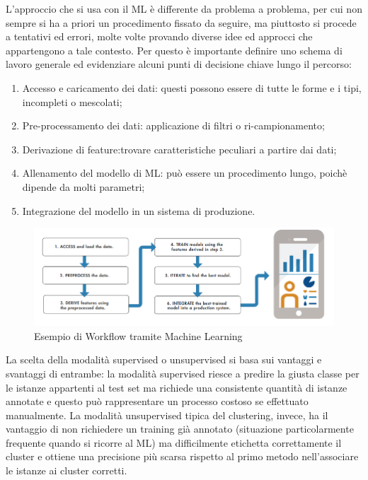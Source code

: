L'approccio che si usa con il ML è differente da problema a problema, per cui non sempre si ha a priori un procedimento fissato da seguire, ma piuttosto si procede a tentativi ed errori, molte volte provando diverse idee ed approcci che appartengono a tale contesto. Per questo è importante definire uno schema di lavoro generale ed evidenziare alcuni punti di decisione chiave lungo il percorso:
\begin{enumerate}
	\item Accesso e caricamento dei dati: questi possono essere di tutte le forme e i tipi, incompleti o mescolati;
	\item Pre-processamento dei dati: applicazione di filtri o ri-campionamento;
	\item Derivazione di feature:trovare caratteristiche peculiari a partire dai dati;
	\item Allenamento del modello di ML: può essere un procedimento lungo, poichè dipende da molti parametri;
	\item Integrazione del modello in un sistema di produzione.
\end{enumerate}
\begin{figure}[]
	\centering
	\includegraphics[scale=0.55]{images/Workflow_ML.png}
	\caption{Esempio di Workflow tramite Machine Learning}
\end{figure}
La scelta della modalità supervised o unsupervised si basa sui vantaggi e svantaggi di entrambe: la modalità supervised riesce a predire la giusta classe per le istanze appartenti al test set ma richiede una consistente quantità di istanze annotate e questo può rappresentare un processo costoso se effettuato manualmente. La modalità unsupervised tipica del clustering, invece, ha il vantaggio di non richiedere un training già annotato (situazione particolarmente frequente quando si
ricorre al ML) ma difficilmente etichetta correttamente il cluster e ottiene una precisione più scarsa rispetto al primo metodo nell'associare le istanze ai cluster corretti. 

